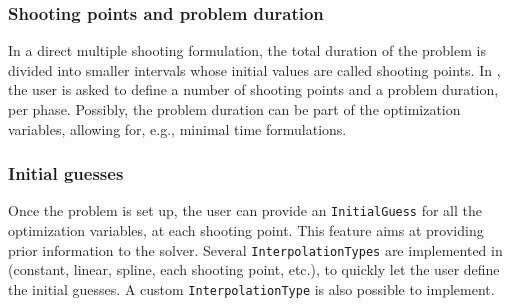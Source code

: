 \subsubsection{Shooting points and problem duration}
In a direct multiple shooting formulation, the total duration of the problem is divided into smaller intervals whose initial values are called shooting points. 
In \bioptim, the user is asked to define a number of shooting points and a problem duration, per phase.
Possibly, the problem duration can be part of the optimization variables, allowing for, e.g., minimal time formulations.

\subsubsection{Initial guesses}
Once the problem is set up, the user can provide an \texttt{InitialGuess} for all the optimization variables, at each shooting point.
This feature aims at providing prior information to the solver.
Several \texttt{InterpolationTypes} are implemented in \bioptim (constant, linear, spline, each shooting point, etc.), to quickly let the user define the initial guesses.
A custom \texttt{InterpolationType} is also possible to implement.